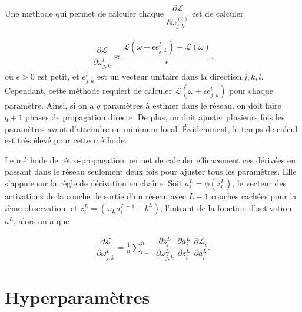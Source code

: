 Une méthode qui permet de calculer chaque $\dfrac{\partial\mathcal{L}}{\partial \omega^{(l)}_{j,k}}$ est de calculer

\begin{align*}
\dfrac{\partial \mathcal{L}}{\partial \omega_{j,k}^l} \approx \dfrac{\mathcal{L}\left(\omega+\epsilon e_{j,k}^l \right)-\mathcal{L}(\omega)}{\epsilon}.
\end{align*}
où $\epsilon>0$ est petit, et $ e_{j,k}^l$ est un vecteur unitaire dans la direction,$j,k,l$. Cependant, cette méthode requiert de calculer $\mathcal{L}\left(\omega+\epsilon e_{j,k}^l \right)$ pour chaque paramètre. Ainsi, si on a $q$ paramètres à estimer dans le réseau, on doit faire $q + 1$ phases de propagation directe. De plus, on doit ajuster plusieurs fois les paramètres avant d'atteindre un minimum local. Évidemment, le temps de calcul est très élevé pour cette méthode. 


Le méthode de rétro-propagation permet de calculer efficacement ces dérivées en passant dans le réseau seulement deux fois pour ajuster tous les paramètres. Elle s'appuie sur la règle de dérivation en chaîne. Soit $a^L_i = \phi(z^L_i)$, le vecteur des activations de la couche de sortie d'un réseau avec $L-1$ couches cachées pour la $i$ème observation, et $z^L_i = (\omega_L a^{L-1}_i + b^L) $, l'intrant de la fonction d'activation $a^L$, alors on a que

\begin{align*}
\dfrac{\partial \mathcal{L}}{\partial \omega_{j,k}^L} =  \frac{1}{n} \sum _{i=1}^n\dfrac{\partial z^{L}_i }{\partial \omega_{j,k}^L} \;\dfrac{\partial a^L_i}{\partial z^{L}_i} \; \dfrac{\partial \mathcal{L}_i}{\partial a^L_i}.
\end{align*} 



\section{Hyperparamètres}
\label{sec:RN:hyperparametres}

